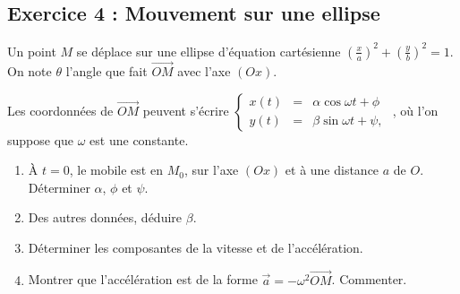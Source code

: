 \subsection{Exercice 4 : Mouvement sur une ellipse}

Un point $M$ se déplace sur une ellipse d'équation cartésienne $\left(\frac{x}{a}\right)^2 + \left(\frac{y}{b}\right)^2 = 1$. On note $\theta$ l'angle que fait $\vec{OM}$ avec l'axe $(Ox)$.

Les coordonnées de $\vec{OM}$ peuvent s'écrire 
$\left\{\begin{array}{ccc}
	x(t) & = & \alpha \cos{\omega t + \phi} \\
	y(t) & = & \beta \sin{\omega t + \psi},
\end{array}\right.$
, où l'on suppose que $\omega$ est une constante.

\begin{enumerate}
	\item À $t=0$, le mobile est en $M_0$, sur l'axe $(Ox)$ et à une distance $a$ de $O$. Déterminer $\alpha$, $\phi$ et $\psi$.
	\item Des autres données, déduire $\beta$.
	\item Déterminer les composantes de la vitesse et de l'accélération.
	\item Montrer que l'accélération est de la forme $\vec{a} = -\omega^2 \vec{OM}$. Commenter.
\end{enumerate}

